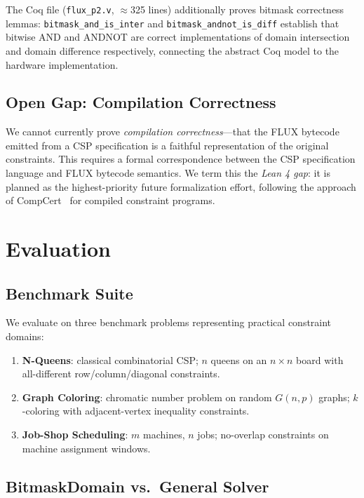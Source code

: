 \documentclass[sigplan,10pt,review]{acmart}
\begin{document}
The Coq file (\texttt{flux\_p2.v}, $\approx$325 lines) additionally proves bitmask
correctness lemmas: \texttt{bitmask\_and\_is\_inter} and \texttt{bitmask\_andnot\_is\_diff}
establish that bitwise AND and ANDNOT are correct implementations of domain intersection
and domain difference respectively, connecting the abstract Coq model to the hardware
implementation.

\subsection{Open Gap: Compilation Correctness}

We cannot currently prove \emph{compilation correctness}---that the FLUX bytecode
emitted from a CSP specification is a faithful representation of the original constraints.
This requires a formal correspondence between the CSP specification language and FLUX
bytecode semantics. We term this the \emph{Lean 4 gap}: it is planned as the
highest-priority future formalization effort, following the approach of
CompCert~\cite{leroy2009} for compiled constraint programs.

\section{Evaluation}
\label{sec:eval}

\subsection{Benchmark Suite}

We evaluate on three benchmark problems representing practical constraint domains:

\begin{enumerate}
  \item \textbf{N-Queens}: classical combinatorial CSP; $n$ queens on an $n \times n$
    board with all-different row/column/diagonal constraints.
  \item \textbf{Graph Coloring}: chromatic number problem on random $G(n,p)$ graphs;
    $k$-coloring with adjacent-vertex inequality constraints.
  \item \textbf{Job-Shop Scheduling}: $m$ machines, $n$ jobs; no-overlap constraints
    on machine assignment windows.
\end{enumerate}

\subsection{BitmaskDomain vs.\ General Solver}
\end{document}
